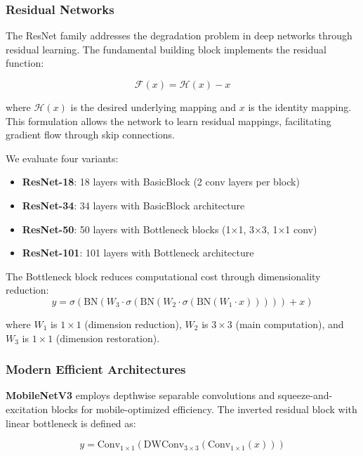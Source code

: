 \subsubsection{Residual Networks}

The ResNet family addresses the degradation problem in deep networks through residual learning. The fundamental building block implements the residual function:

\begin{equation}
\mathcal{F}(x) = \mathcal{H}(x) - x
\end{equation}

where $\mathcal{H}(x)$ is the desired underlying mapping and $x$ is the identity mapping. This formulation allows the network to learn residual mappings, facilitating gradient flow through skip connections.

We evaluate four variants:
\begin{itemize}
    \item \textbf{ResNet-18}: 18 layers with BasicBlock (2 conv layers per block)
    \item \textbf{ResNet-34}: 34 layers with BasicBlock architecture
    \item \textbf{ResNet-50}: 50 layers with Bottleneck blocks (1×1, 3×3, 1×1 conv)
    \item \textbf{ResNet-101}: 101 layers with Bottleneck architecture
\end{itemize}

The Bottleneck block reduces computational cost through dimensionality reduction:
\begin{equation}
y = \sigma(\text{BN}(W_3 \cdot \sigma(\text{BN}(W_2 \cdot \sigma(\text{BN}(W_1 \cdot x))))) + x)
\end{equation}

where $W_1$ is $1 \times 1$ (dimension reduction), $W_2$ is $3 \times 3$ (main computation), and $W_3$ is $1 \times 1$ (dimension restoration).

\subsubsection{Modern Efficient Architectures}

\textbf{MobileNetV3} employs depthwise separable convolutions and squeeze-and-excitation blocks for mobile-optimized efficiency. The inverted residual block with linear bottleneck is defined as:

\begin{equation}
y = \text{Conv}_{1 \times 1}(\text{DWConv}_{3 \times 3}(\text{Conv}_{1 \times 1}(x)))
\end{equation}

